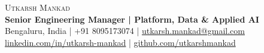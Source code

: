 \begin{center}
{\LARGE\scshape Utkarsh Mankad}\\[2pt]
\textbf{Senior Engineering Manager | Platform, Data \& Applied AI}\\[2pt]
{\small Bengaluru, India | +91 8095173074 | \href{mailto:utkarsh.mankad@gmail.com}{utkarsh.mankad@gmail.com}\\
\href{https://linkedin.com/in/utkarsh-mankad}{linkedin.com/in/utkarsh-mankad} | \href{https://github.com/utkarshmankad}{github.com/utkarshmankad}}
\end{center}
